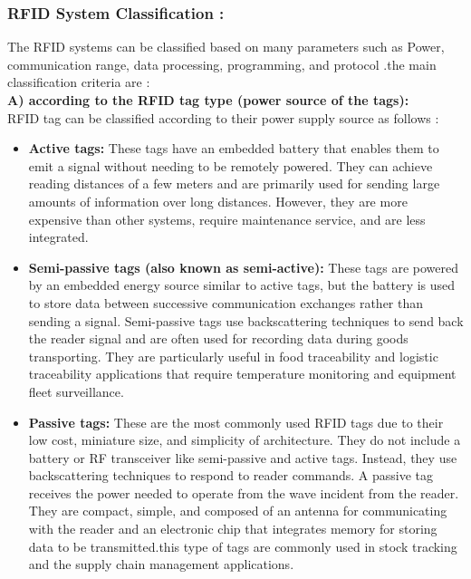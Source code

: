 \subsubsection{RFID System Classification :}
The RFID systems can be classified based on many parameters such as Power, communication range, data processing, programming, and protocol\cite{duroc2022identification} .the main classification criteria are :\\\textbf{A) according to the RFID tag type (power source of the tags):}\\
RFID tag can be classified according to their power supply source as follows :\\
\begin{itemize}
	
	
	\item \textbf{ Active tags:} These tags have an embedded battery that enables them to emit a signal without needing to be remotely powered. They can achieve reading distances of a few meters and are primarily used for sending large amounts of information over long distances. However, they are more expensive than other systems, require maintenance service, and are less integrated.\cite{chawla2007overview}
	\item \textbf{ Semi-passive tags (also known as semi-active):} These tags are powered by an embedded energy source similar to active tags, but the battery is used to store data between successive communication exchanges rather than sending a signal. Semi-passive tags use backscattering techniques to send back the reader signal and are often used for recording data during goods transporting. They are particularly useful in food traceability and logistic traceability applications that require temperature monitoring and equipment fleet surveillance.
	\item \textbf{ Passive tags:} These are the most commonly used RFID tags due to their low cost, miniature size, and simplicity of architecture. They do not include a battery or RF transceiver like semi-passive and active tags. Instead, they use backscattering techniques to respond to reader commands. A passive tag receives the power needed to operate from the wave incident from the reader. They are compact, simple, and composed of an antenna for communicating with the reader and an electronic chip that integrates memory for storing data to be transmitted.this type of tags are commonly used in stock tracking and the supply chain management applications.
\end{itemize}
